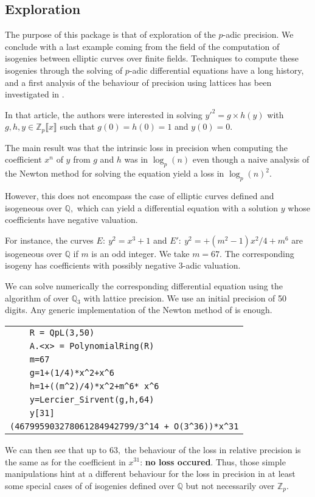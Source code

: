 \documentclass[sigconf]{acmart}
\theoremstyle{definition}
\begin{document}
\subsection{Exploration}

The purpose of this package is that of exploration
of the $p$-adic precision.
We conclude with a last example coming
from the field of the computation of
isogenies between elliptic curves over finite fields.
Techniques to compute these isogenies
through the solving of $p$-adic differential equations
have a long history, and a first
analysis of the behaviour of precision using
lattices has been investigated in \cite{LV16}.

In that article, the authors were interested in
solving $y'^2=g \times h(y)$ with
$g,h,y \in \mathbb{Z}_p \llbracket x \rrbracket$
such that $g(0)=h(0)=1$ and $y(0)=0.$

The main result was that the intrinsic loss in precision
when computing the coefficient $x^n$ of $y$
from $g$ and $h$ was in $\log_p(n)$
even though a naive analysis of
the Newton method for solving the equation
yield a loss in $\log_p(n)^2.$

However, this does not encompass the case of 
elliptic curves defined and isogeneous 
over $\mathbb{Q},$ which can yield a differential 
equation with a solution $y$ whose coefficients
have negative valuation.

For instance, the curves 
$E: \: y^2=x^3+1$
and $E': \: y^2=+ (m^2-1)x^2/4 + m^6$ are isogeneous
over $\mathbb{Q}$ if  $m$ is an odd integer.
We take $m=67.$ The corresponding isogeny has coefficients with possibly
negative $3$-adic valuation.

We can solve numerically 
the corresponding differential equation
using the algorithm of \cite{Lercier-Sirvent:08}
over $\mathbb{Q}_3$ with lattice precision.
We use an initial precision of 50 digits.
Any generic implementation of the Newton
method of \cite{Lercier-Sirvent:08} is enough.

\begin{tabular}{|l|}
\verb?    R = QpL(3,50)? \\
\verb?    A.<x> = PolynomialRing(R)?\\
\verb?    m=67?\\
\verb?    g=1+(1/4)*x^2+x^6?\\
\verb?    h=1+((m^2)/4)*x^2+m^6* x^6?\\
\verb?    y=Lercier_Sirvent(g,h,64)?\\
\verb?    y[31]?\\
\verb?(467995903278061284942799/3^14 + O(3^36))*x^31?\\
\end{tabular}

We can then see that up to $63,$ the behaviour
of the loss in relative precision is the same
as for the coefficient in $x^{31}$: \textbf{no loss
occured}.
Thus, those simple manipulations
hint at a different behaviour for the loss 
in precision in at least some special cases of
of isogenies defined over $\mathbb{Q}$
but not necessarily over $\mathbb{Z}_p.$ 



\end{document}
